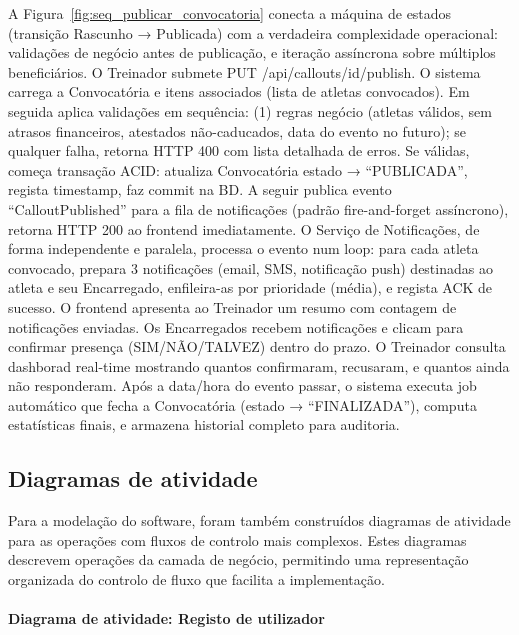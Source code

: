 \documentclass[a4paper,12pt]{scrreprt}
\begin{document}
{A Figura~\ref{fig:seq_publicar_convocatoria} conecta a máquina de estados (transição Rascunho → Publicada) com a verdadeira complexidade operacional: validações de negócio antes de publicação, e iteração assíncrona sobre múltiplos beneficiários. O Treinador submete PUT /api/callouts/{id}/publish. O sistema carrega a Convocatória e itens associados (lista de atletas convocados). Em seguida aplica validações em sequência: (1) regras negócio (atletas válidos, sem atrasos financeiros, atestados não-caducados, data do evento no futuro); se qualquer falha, retorna HTTP 400 com lista detalhada de erros. Se válidas, começa transação ACID: atualiza Convocatória estado → ``PUBLICADA'', regista timestamp, faz commit na BD. A seguir publica evento ``CalloutPublished'' para a fila de notificações (padrão fire-and-forget assíncrono), retorna HTTP 200 ao frontend imediatamente. O Serviço de Notificações, de forma independente e paralela, processa o evento num loop: para cada atleta convocado, prepara 3 notificações (email, SMS, notificação push) destinadas ao atleta e seu Encarregado, enfileira-as por prioridade (média), e regista ACK de sucesso. O frontend apresenta ao Treinador um resumo com contagem de notificações enviadas. Os Encarregados recebem notificações e clicam para confirmar presença (SIM/NÃO/TALVEZ) dentro do prazo. O Treinador consulta dashborad real-time mostrando quantos confirmaram, recusaram, e quantos ainda não responderam. Após a data/hora do evento passar, o sistema executa job automático que fecha a Convocatória (estado → ``FINALIZADA''), computa estatísticas finais, e armazena historial completo para auditoria.


\subsection{Diagramas de atividade}

Para a modelação do software, foram também construídos diagramas de atividade para as operações
com fluxos de controlo mais complexos. Estes diagramas descrevem operações da camada de negócio,
permitindo uma representação organizada do controlo de fluxo que facilita a implementação.

\paragraph{Diagrama de atividade: Registo de utilizador}

}
\end{document}
